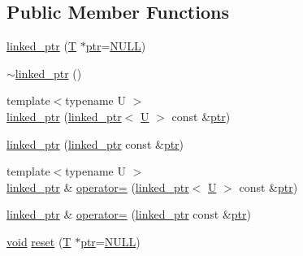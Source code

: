 \subsection*{Public Member Functions}
\begin{DoxyCompactItemize}
\item 
\hyperlink{classtesting_1_1internal_1_1linked__ptr_ae805418b9f03f14ff49649e710475dba}{linked\-\_\-ptr} (\hyperlink{calib3d_8hpp_a3efb9551a871ddd0463079a808916717}{T} $\ast$\hyperlink{core__c_8h_a166529da793cc1ef241cff347f3db5a5}{ptr}=\hyperlink{Config_8cpp_a070d2ce7b6bb7e5c05602aa8c308d0c4}{N\-U\-L\-L})
\item 
\hyperlink{classtesting_1_1internal_1_1linked__ptr_af99460fd09ca0f83e061ea480ef1a45e}{$\sim$linked\-\_\-ptr} ()
\item 
{\footnotesize template$<$typename U $>$ }\\\hyperlink{classtesting_1_1internal_1_1linked__ptr_a7597ed91006edd0467c99bd1aaab07f5}{linked\-\_\-ptr} (\hyperlink{classtesting_1_1internal_1_1linked__ptr}{linked\-\_\-ptr}$<$ \hyperlink{core__c_8h_aa9c521f41af9a5191e5e4b6ffbae211a}{U} $>$ const \&\hyperlink{core__c_8h_a166529da793cc1ef241cff347f3db5a5}{ptr})
\item 
\hyperlink{classtesting_1_1internal_1_1linked__ptr_abc076b5678cc7f64306d5ecfefc93aff}{linked\-\_\-ptr} (\hyperlink{classtesting_1_1internal_1_1linked__ptr}{linked\-\_\-ptr} const \&\hyperlink{core__c_8h_a166529da793cc1ef241cff347f3db5a5}{ptr})
\item 
{\footnotesize template$<$typename U $>$ }\\\hyperlink{classtesting_1_1internal_1_1linked__ptr}{linked\-\_\-ptr} \& \hyperlink{classtesting_1_1internal_1_1linked__ptr_a82608d98869b750d9ab729f1450a9a45}{operator=} (\hyperlink{classtesting_1_1internal_1_1linked__ptr}{linked\-\_\-ptr}$<$ \hyperlink{core__c_8h_aa9c521f41af9a5191e5e4b6ffbae211a}{U} $>$ const \&\hyperlink{core__c_8h_a166529da793cc1ef241cff347f3db5a5}{ptr})
\item 
\hyperlink{classtesting_1_1internal_1_1linked__ptr}{linked\-\_\-ptr} \& \hyperlink{classtesting_1_1internal_1_1linked__ptr_a1f40b5e66e6cf7b661ea116c806f952e}{operator=} (\hyperlink{classtesting_1_1internal_1_1linked__ptr}{linked\-\_\-ptr} const \&\hyperlink{core__c_8h_a166529da793cc1ef241cff347f3db5a5}{ptr})
\item 
\hyperlink{legacy_8hpp_a8bb47f092d473522721002c86c13b94e}{void} \hyperlink{classtesting_1_1internal_1_1linked__ptr_a95ba3b7b66ed0193c779976c6e126ab6}{reset} (\hyperlink{calib3d_8hpp_a3efb9551a871ddd0463079a808916717}{T} $\ast$\hyperlink{core__c_8h_a166529da793cc1ef241cff347f3db5a5}{ptr}=\hyperlink{Config_8cpp_a070d2ce7b6bb7e5c05602aa8c308d0c4}{N\-U\-L\-L})

\end{DoxyCompactItemize}
